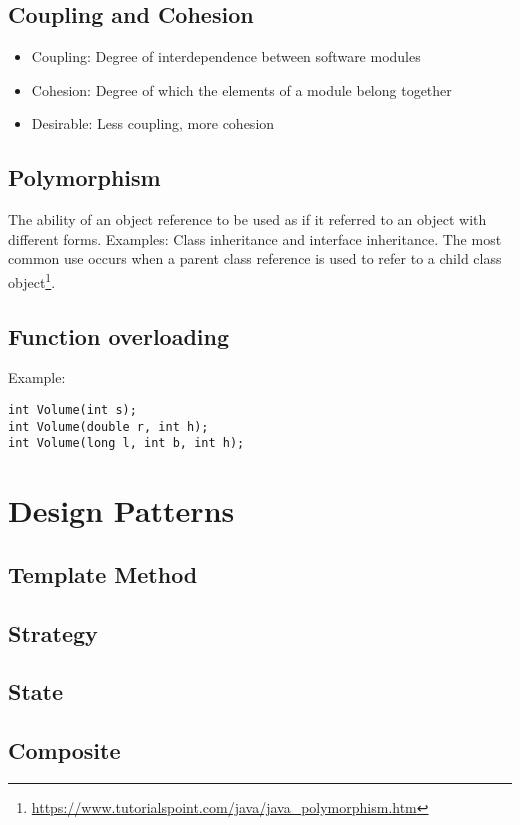 \documentclass[a4paper, 11.25pt]{article}
\begin{document}
\subsection{Coupling and Cohesion}
\begin{itemize}
    \item Coupling: Degree of interdependence between software modules
    \item Cohesion: Degree of which the elements of a module belong together
    \item Desirable: Less coupling, more cohesion
\end{itemize}

\subsection{Polymorphism}
The ability of an object reference to be used as if it referred to an object with different forms. Examples: Class inheritance and interface inheritance. The most common use occurs when a parent class reference is used to refer to a child class object\footnote{\url{https://www.tutorialspoint.com/java/java_polymorphism.htm}}.

\subsection{Function overloading}
Example:
\begin{lstlisting}[style=CStyle]
int Volume(int s);
int Volume(double r, int h);
int Volume(long l, int b, int h);\end{lstlisting}

\clearpage
\section{Design Patterns}
\subsection{Template Method}
\subsection{Strategy}
\subsection{State}
\subsection{Composite}
\end{document}
